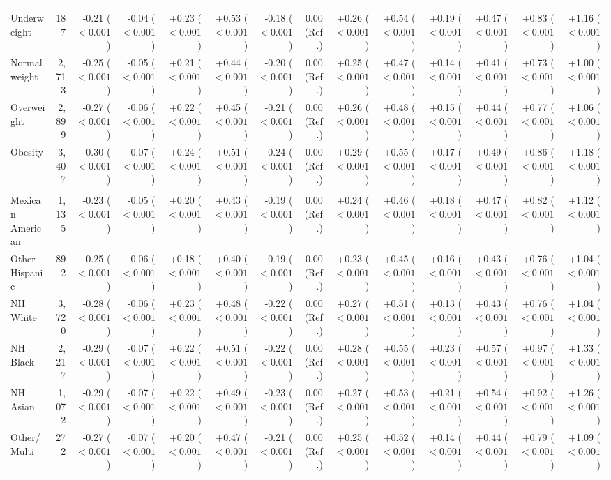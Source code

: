 \documentclass[10pt]{article}
\begin{document}
{\begin{tabular}{lr*{12}{r}}
\addlinespace[5pt]\multicolumn{14}{l}{\textbf{BMI}}\\
Underweight & 187 & -0.21 ($<0.001$) & -0.04 ($<0.001$) & +0.23 ($<0.001$) & +0.53 ($<0.001$) & -0.18 ($<0.001$) & 0.00 (Ref.) & +0.26 ($<0.001$) & +0.54 ($<0.001$) & +0.19 ($<0.001$) & +0.47 ($<0.001$) & +0.83 ($<0.001$) & +1.16 ($<0.001$) \\
Normal weight & 2,713 & -0.25 ($<0.001$) & -0.05 ($<0.001$) & +0.21 ($<0.001$) & +0.44 ($<0.001$) & -0.20 ($<0.001$) & 0.00 (Ref.) & +0.25 ($<0.001$) & +0.47 ($<0.001$) & +0.14 ($<0.001$) & +0.41 ($<0.001$) & +0.73 ($<0.001$) & +1.00 ($<0.001$) \\
Overweight & 2,899 & -0.27 ($<0.001$) & -0.06 ($<0.001$) & +0.22 ($<0.001$) & +0.45 ($<0.001$) & -0.21 ($<0.001$) & 0.00 (Ref.) & +0.26 ($<0.001$) & +0.48 ($<0.001$) & +0.15 ($<0.001$) & +0.44 ($<0.001$) & +0.77 ($<0.001$) & +1.06 ($<0.001$) \\
Obesity & 3,407 & -0.30 ($<0.001$) & -0.07 ($<0.001$) & +0.24 ($<0.001$) & +0.51 ($<0.001$) & -0.24 ($<0.001$) & 0.00 (Ref.) & +0.29 ($<0.001$) & +0.55 ($<0.001$) & +0.17 ($<0.001$) & +0.49 ($<0.001$) & +0.86 ($<0.001$) & +1.18 ($<0.001$) \\
\addlinespace[5pt]\multicolumn{14}{l}{\textbf{Race/ethnicity}}\\
Mexican American & 1,135 & -0.23 ($<0.001$) & -0.05 ($<0.001$) & +0.20 ($<0.001$) & +0.43 ($<0.001$) & -0.19 ($<0.001$) & 0.00 (Ref.) & +0.24 ($<0.001$) & +0.46 ($<0.001$) & +0.18 ($<0.001$) & +0.47 ($<0.001$) & +0.82 ($<0.001$) & +1.12 ($<0.001$) \\
Other Hispanic & 892 & -0.25 ($<0.001$) & -0.06 ($<0.001$) & +0.18 ($<0.001$) & +0.40 ($<0.001$) & -0.19 ($<0.001$) & 0.00 (Ref.) & +0.23 ($<0.001$) & +0.45 ($<0.001$) & +0.16 ($<0.001$) & +0.43 ($<0.001$) & +0.76 ($<0.001$) & +1.04 ($<0.001$) \\
NH White & 3,720 & -0.28 ($<0.001$) & -0.06 ($<0.001$) & +0.23 ($<0.001$) & +0.48 ($<0.001$) & -0.22 ($<0.001$) & 0.00 (Ref.) & +0.27 ($<0.001$) & +0.51 ($<0.001$) & +0.13 ($<0.001$) & +0.43 ($<0.001$) & +0.76 ($<0.001$) & +1.04 ($<0.001$) \\
NH Black & 2,217 & -0.29 ($<0.001$) & -0.07 ($<0.001$) & +0.22 ($<0.001$) & +0.51 ($<0.001$) & -0.22 ($<0.001$) & 0.00 (Ref.) & +0.28 ($<0.001$) & +0.55 ($<0.001$) & +0.23 ($<0.001$) & +0.57 ($<0.001$) & +0.97 ($<0.001$) & +1.33 ($<0.001$) \\
NH Asian & 1,072 & -0.29 ($<0.001$) & -0.07 ($<0.001$) & +0.22 ($<0.001$) & +0.49 ($<0.001$) & -0.23 ($<0.001$) & 0.00 (Ref.) & +0.27 ($<0.001$) & +0.53 ($<0.001$) & +0.21 ($<0.001$) & +0.54 ($<0.001$) & +0.92 ($<0.001$) & +1.26 ($<0.001$) \\
Other/Multi & 272 & -0.27 ($<0.001$) & -0.07 ($<0.001$) & +0.20 ($<0.001$) & +0.47 ($<0.001$) & -0.21 ($<0.001$) & 0.00 (Ref.) & +0.25 ($<0.001$) & +0.52 ($<0.001$) & +0.14 ($<0.001$) & +0.44 ($<0.001$) & +0.79 ($<0.001$) & +1.09 ($<0.001$) \\
\bottomrule\end{tabular}}
\end{document}
